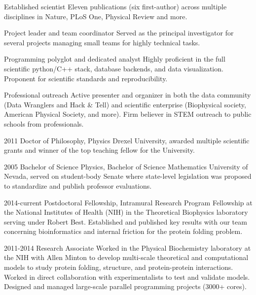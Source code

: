 \documentclass[]{scrartcl}
\begin{document}
\begin{cleanCV}

\vspace{-1em}


\Highlight
{Established scientist}
{Eleven publications (six first-author) across multiple disciplines in Nature, PLoS One, Physical Review and more.}

\Highlight
{Project leader and team coordinator}
{Served as the principal investigator for several projects managing small teams for highly technical tasks.}

\Highlight
{Programming polyglot and dedicated analyst}
{Highly proficient in the full scientific python/C++ stack, database backends, and data visualization. 
Proponent for scientific standards and reproducibility.}

\Highlight
{Professional outreach}
{Active presenter and organizer in both the data community (Data Wranglers and Hack \& Tell) and scientific enterprise (Biophysical society, American Physical Society, and more). Firm believer in STEM outreach to public schools from professionals.}


\WorkExperience
{2011}
{Doctor of Philosophy, Physics}
{Drexel University, awarded multiple scientific grants and winner of the top teaching fellow for the University.}

\WorkExperience
{2005}
{Bachelor of Science Physics, Bachelor of Science Mathematics}
{University of Nevada, served on student-body Senate where state-level legislation was proposed to standardize and publish professor evaluations.}



\WorkExperience
{2014-current}
{Postdoctoral Fellowship, Intramural Research Program}
{
Fellowship at the National Institutes of Health (NIH) in the Theoretical Biophysics laboratory serving under Robert Best.
Established and published key results with our team concerning bioinformatics and internal friction for the protein folding problem.
}

\WorkExperience
{2011-2014}
{Research Associate}
{
Worked in the Physical Biochemistry laboratory at the NIH with Allen Minton to develop multi-scale theoretical and computational models to study protein folding, structure, and protein-protein interactions.
Worked in direct collaboration with experimentalists to test and validate models.
Designed and managed large-scale parallel programming projects (3000+ cores).
}


\end{cleanCV}
\end{document}
